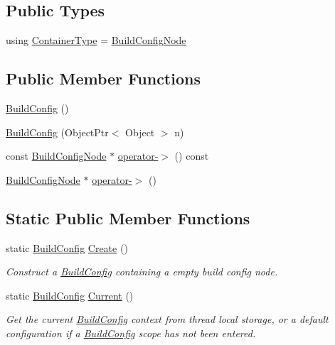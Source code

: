 \subsection*{Public Types}
\begin{DoxyCompactItemize}
\item 
using \hyperlink{classtvm_1_1BuildConfig_a19731750cf38b14cfe9359d17b018010}{Container\+Type} = \hyperlink{classtvm_1_1BuildConfigNode}{Build\+Config\+Node}
\end{DoxyCompactItemize}
\subsection*{Public Member Functions}
\begin{DoxyCompactItemize}
\item 
\hyperlink{classtvm_1_1BuildConfig_aebc73ce62d891917e153b34649f2c01a}{Build\+Config} ()
\item 
\hyperlink{classtvm_1_1BuildConfig_a574080dbfa73e8ca69b0ad9ff09cd1ec}{Build\+Config} (Object\+Ptr$<$ Object $>$ n)
\item 
const \hyperlink{classtvm_1_1BuildConfigNode}{Build\+Config\+Node} $\ast$ \hyperlink{classtvm_1_1BuildConfig_a6a644909a873a746d5501561e97d01a7}{operator-\/$>$} () const 
\item 
\hyperlink{classtvm_1_1BuildConfigNode}{Build\+Config\+Node} $\ast$ \hyperlink{classtvm_1_1BuildConfig_ada70f5f8be779e6e3b306fb6282673b0}{operator-\/$>$} ()
\end{DoxyCompactItemize}
\subsection*{Static Public Member Functions}
\begin{DoxyCompactItemize}
\item 
static \hyperlink{classtvm_1_1BuildConfig}{Build\+Config} \hyperlink{classtvm_1_1BuildConfig_a21604a1a651be45187c101936b9b42f0}{Create} ()
\begin{DoxyCompactList}\small\item\em Construct a \hyperlink{classtvm_1_1BuildConfig}{Build\+Config} containing a empty build config node. \end{DoxyCompactList}\item 
static \hyperlink{classtvm_1_1BuildConfig}{Build\+Config} \hyperlink{classtvm_1_1BuildConfig_acf91cba15c6989af01133a85711a794f}{Current} ()
\begin{DoxyCompactList}\small\item\em Get the current \hyperlink{classtvm_1_1BuildConfig}{Build\+Config} context from thread local storage, or a default configuration if a \hyperlink{classtvm_1_1BuildConfig}{Build\+Config} scope has not been entered. \end{DoxyCompactList}\end{DoxyCompactItemize}
